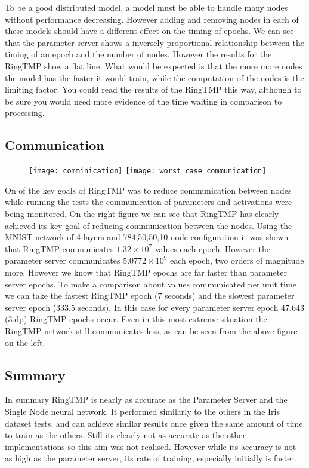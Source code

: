 To be a good distributed model, a model must be able to handle many nodes
without performance decreasing. However adding and removing nodes in each of
these models should have a different effect on the timing of epochs. We can see
that the parameter server shows a inversely proportional relationship between
the timing of an epoch and the number of nodes. However the results for the
RingTMP show a flat line. What would be expected is that the more more nodes the
model has the faster it would train, while the computation of the nodes is the
limiting factor. You could read the results of the RingTMP this way, although to
be sure you would need more evidence of the time waiting in comparison to processing.

\subsection{Communication}
\begin{figure}[h]
    \centering
    \texttt{[image: comminication]}
    \texttt{[image: worst\_case\_communication]}

\end{figure}
On of the key goals of RingTMP was to reduce communication between nodes while
running the tests the communication of parameters and activations were being
monitored. On the right figure we can see that RingTMP has clearly achieved its
key goal of reducing communication between the nodes. Using the MNIST network of
4 layers and 784,50,50,10 node configuration it was shown that RingTMP
communicates \(1.32 \times 10^{7}\) values each epoch. However the parameter
server communicates \( 5.0772 \times 10^{9}\) each epoch, two orders of
magnitude more. However we know that RingTMP epochs are far faster than
parameter server epochs. To make a comparison about values communicated per unit
time we can take the fastest RingTMP epoch (7 seconds) and the slowest parameter
server epoch (333.5 seconds). In this case for every parameter server epoch
47.643 (3.dp) RingTMP epochs occur. Even in this most extreme situation the
RingTMP network still communicates less, as can be seen from the above figure on
the left.


\subsection{Summary}
In summary RingTMP is nearly as accurate as the Parameter Server and the Single
Node neural network. It performed similarly to the others in the Iris dataset
tests, and can achieve similar results once given the same amount of time to
train as the others. Still its clearly not as accurate as the other
implementations so this aim was not realised. However while its accuracy is not
as high as the parameter server, its rate of training, especially initially is
faster.

